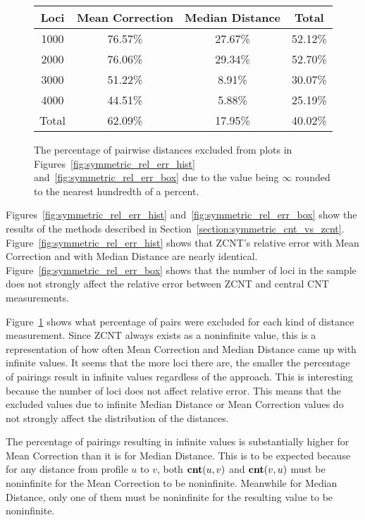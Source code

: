 \begin{figure}[ht]
    \centering 
    \begin{tabular}{|c|c|c|c|} \hline
        Loci & Mean Correction & Median Distance & Total \\ \hline \hline
        1000 & 76.57\% & 27.67\% & 52.12\% \\ 
        2000 & 76.06\% & 29.34\% & 52.70\% \\ 
        3000 & 51.22\% & 8.91\% & 30.07\% \\ 
        4000 & 44.51\% & 5.88\% & 25.19\% \\ \hline
        Total & 62.09\% & 17.95\% & 40.02\% \\ \hline
    \end{tabular}
    \caption{The percentage of pairwise distances excluded from plots in Figures~\ref{fig:symmetric_rel_err_hist} and~\ref{fig:symmetric_rel_err_box} due to the value being $\infty$ rounded to the nearest hundredth of a percent.}\label{fig:excluded_table}
\end{figure}
    
Figures~\ref{fig:symmetric_rel_err_hist} and~\ref{fig:symmetric_rel_err_box} show the results of the methods described in Section~\ref{section:symmetric_cnt_vs_zcnt}. Figure~\ref{fig:symmetric_rel_err_hist} shows that ZCNT's relative error with Mean Correction and with Median Distance are nearly identical. Figure~\ref{fig:symmetric_rel_err_box} shows that the number of loci in the sample does not strongly affect the relative error between ZCNT and central CNT measurements. 

Figure~\ref{fig:excluded_table} shows what percentage of pairs were excluded for each kind of distance measurement. Since ZCNT always exists as a noninfinite value, this is a representation of how often Mean Correction and Median Distance came up with infinite values. It seems that the more loci there are, the smaller the percentage of pairings result in infinite values regardless of the approach. This is interesting because the number of loci does not affect relative error. This means that the excluded values due to infinite Median Distance or Mean Correction values do not strongly affect the distribution of the distances.

The percentage of pairings resulting in infinite values is substantially higher for Mean Correction than it is for Median Distance. This is to be expected because for any distance from profile $u$ to $v$, both $\textbf{cnt}(u, v)$ and $\textbf{cnt}(v, u)$ must be noninfinite for the Mean Correction to be noninfinite. Meanwhile for Median Distance, only one of them must be noninfinite for the resulting value to be noninfinite.